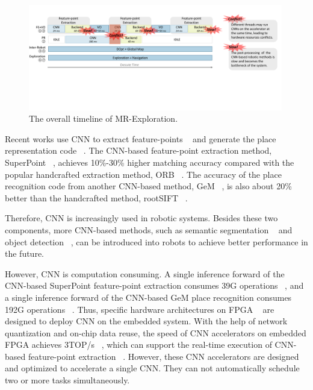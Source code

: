 \begin{figure}[t]
    \centering
	\includegraphics[width=0.99\textwidth]{fig/overalltime.pdf} 	
    \caption{
    The overall timeline of MR-Exploration.
    }
	\label{fig:overalltime}
\end{figure}

Recent works use CNN to extract feature-points  ~\cite{detone2018superpoint, simo2015discriminative, yi2016lift} and generate the place representation code  ~\cite{arandjelovic2016netvlad, radenovic2018fine}. 
The CNN-based feature-point extraction method, SuperPoint  ~\cite{detone2018superpoint}, achieves 10\%-30\% higher matching accuracy compared with the popular handcrafted extraction method, ORB ~\cite{Mur-Artal:2017281}.
The accuracy of the place recognition code from another CNN-based method, GeM  ~\cite{radenovic2018fine}, is also about 20\% better than the handcrafted method, rootSIFT  ~\cite{jegou2014triang}.

Therefore, CNN is increasingly used in robotic systems. 
Besides these two components, more CNN-based methods, such as semantic segmentation  ~\cite{long2015fully} and object detection  ~\cite{ren2015faster}, can be introduced into robots to achieve better performance in the future.

However, CNN is computation consuming. A single inference forward of the CNN-based SuperPoint feature-point extraction consumes 39G operations  ~\cite{detone2018superpoint}, and a single inference forward of the CNN-based GeM  place recognition consumes 192G operations  ~\cite{radenovic2018fine}.
Thus, specific hardware architectures on FPGA  ~\cite{guo2017angel,yu2018instruction,li_high_2016,qiu2016going,lu_evaluating_2017} are designed to deploy CNN on the embedded system.
With the help of network quantization and on-chip data reuse, the speed of CNN accelerators on embedded FPGA achieves 3TOP/s  ~\cite{lu_evaluating_2017}, which can support the real-time execution of CNN-based feature-point extraction  ~\cite{detone2018superpoint}.
However, these CNN accelerators are designed and optimized to accelerate a single CNN. They can not automatically schedule two or more tasks simultaneously. 


